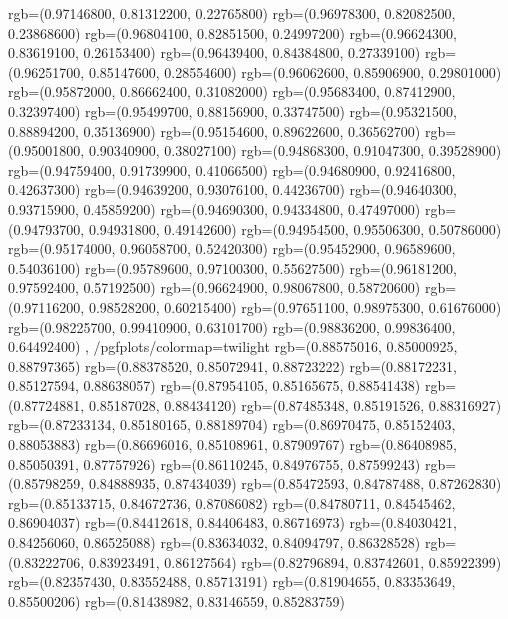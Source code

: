 {{        rgb=(0.97146800, 0.81312200, 0.22765800)
        rgb=(0.96978300, 0.82082500, 0.23868600)
        rgb=(0.96804100, 0.82851500, 0.24997200)
        rgb=(0.96624300, 0.83619100, 0.26153400)
        rgb=(0.96439400, 0.84384800, 0.27339100)
        rgb=(0.96251700, 0.85147600, 0.28554600)
        rgb=(0.96062600, 0.85906900, 0.29801000)
        rgb=(0.95872000, 0.86662400, 0.31082000)
        rgb=(0.95683400, 0.87412900, 0.32397400)
        rgb=(0.95499700, 0.88156900, 0.33747500)
        rgb=(0.95321500, 0.88894200, 0.35136900)
        rgb=(0.95154600, 0.89622600, 0.36562700)
        rgb=(0.95001800, 0.90340900, 0.38027100)
        rgb=(0.94868300, 0.91047300, 0.39528900)
        rgb=(0.94759400, 0.91739900, 0.41066500)
        rgb=(0.94680900, 0.92416800, 0.42637300)
        rgb=(0.94639200, 0.93076100, 0.44236700)
        rgb=(0.94640300, 0.93715900, 0.45859200)
        rgb=(0.94690300, 0.94334800, 0.47497000)
        rgb=(0.94793700, 0.94931800, 0.49142600)
        rgb=(0.94954500, 0.95506300, 0.50786000)
        rgb=(0.95174000, 0.96058700, 0.52420300)
        rgb=(0.95452900, 0.96589600, 0.54036100)
        rgb=(0.95789600, 0.97100300, 0.55627500)
        rgb=(0.96181200, 0.97592400, 0.57192500)
        rgb=(0.96624900, 0.98067800, 0.58720600)
        rgb=(0.97116200, 0.98528200, 0.60215400)
        rgb=(0.97651100, 0.98975300, 0.61676000)
        rgb=(0.98225700, 0.99410900, 0.63101700)
        rgb=(0.98836200, 0.99836400, 0.64492400)
    },
    /pgfplots/colormap={twilight}{
        rgb=(0.88575016, 0.85000925, 0.88797365)
        rgb=(0.88378520, 0.85072941, 0.88723222)
        rgb=(0.88172231, 0.85127594, 0.88638057)
        rgb=(0.87954105, 0.85165675, 0.88541438)
        rgb=(0.87724881, 0.85187028, 0.88434120)
        rgb=(0.87485348, 0.85191526, 0.88316927)
        rgb=(0.87233134, 0.85180165, 0.88189704)
        rgb=(0.86970475, 0.85152403, 0.88053883)
        rgb=(0.86696016, 0.85108961, 0.87909767)
        rgb=(0.86408985, 0.85050391, 0.87757926)
        rgb=(0.86110245, 0.84976755, 0.87599243)
        rgb=(0.85798259, 0.84888935, 0.87434039)
        rgb=(0.85472593, 0.84787488, 0.87262830)
        rgb=(0.85133715, 0.84672736, 0.87086082)
        rgb=(0.84780711, 0.84545462, 0.86904037)
        rgb=(0.84412618, 0.84406483, 0.86716973)
        rgb=(0.84030421, 0.84256060, 0.86525088)
        rgb=(0.83634032, 0.84094797, 0.86328528)
        rgb=(0.83222706, 0.83923491, 0.86127564)
        rgb=(0.82796894, 0.83742601, 0.85922399)
        rgb=(0.82357430, 0.83552488, 0.85713191)
        rgb=(0.81904655, 0.83353649, 0.85500206)
        rgb=(0.81438982, 0.83146559, 0.85283759)
}}
